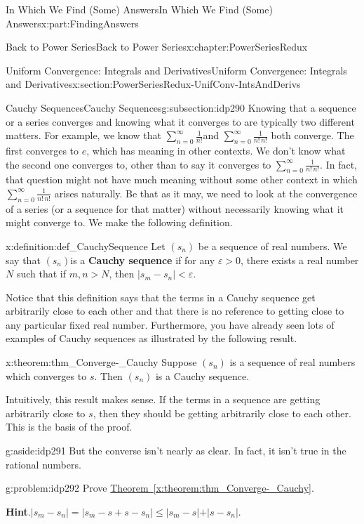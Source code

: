 \documentclass[oneside,10pt,]{book}
\newcommand{\blocktitlefont}{\relax}
\newcommand{\xreffont}{\relax}
\newcommand{\terminology}[1]{\textbf{#1}}
\numberwithin{equation}{section}
\newcommand{\eps}{\varepsilon}
\newcommand{\lt}{<}
\begin{document}
\begin{partptx}{In Which We Find (Some) Answers}{}{In Which We Find (Some) Answers}{}{}{x:part:FindingAnswers}
\begin{chapterptx}{Back to Power Series}{}{Back to Power Series}{}{}{x:chapter:PowerSeriesRedux}
\begin{sectionptx}{Uniform Convergence: Integrals and Derivatives}{}{Uniform Convergence: Integrals and Derivatives}{}{}{x:section:PowerSeriesRedux-UnifConv-IntsAndDerivs}
\begin{subsectionptx}{Cauchy Sequences}{}{Cauchy Sequences}{}{}{g:subsection:idp290}
Knowing that a sequence or a series converges and knowing what it converges to are typically two different matters. For example, we know that \(\sum_{n=0}^\infty\frac{1}{n!}\)and \(\sum_{n=0}^\infty\frac{1}{n!\,n!}\) both converge. The first converges to \(e\), which has meaning in other contexts. We don't know what the second one converges to, other than to say it converges to \(\sum_{n=0}^\infty\frac{1}{n!\,n!}\). In fact, that question might not have much meaning without some other context in which \(\sum_{n=0}^\infty\frac{1}{n!\,n!}\) arises naturally. Be that as it may, we need to look at the convergence of a series (or a sequence for that matter) without necessarily knowing what it might converge to. We make the following definition.%
\begin{definition}{}{x:definition:def_CauchySequence}%
 Let \(\left(s_n\right)\) be a sequence of real numbers. We say that \(\left(s_n\right)\)is a \terminology{Cauchy sequence} if for any \(\eps>0\), there exists a real number \(N\) such that if \(m,n>N\), then \(|s_m-s_n|\lt \eps\).%
\end{definition}
Notice that this definition says that the terms in a Cauchy sequence get arbitrarily close to each other and that there is no reference to getting close to any particular fixed real number. Furthermore, you have already seen lots of examples of Cauchy sequences as illustrated by the following result.%
\begin{theorem}{}{}{x:theorem:thm_Converge-_Cauchy}%
 Suppose \(\left(s_n\right)\) is a sequence of real numbers which converges to \(s\). Then \(\left(s_n\right)\) is a Cauchy sequence.%
\end{theorem}
Intuitively, this result makes sense. If the terms in a sequence are getting arbitrarily close to \(s\), then they should be getting arbitrarily close to each other. This is the basis of the proof.%
\begin{aside}{}{g:aside:idp291}%
But the converse isn't nearly as clear. In fact, it isn't true in the rational numbers.%
\end{aside}
\begin{problem}{}{g:problem:idp292}%
Prove \hyperref[x:theorem:thm_Converge-_Cauchy]{Theorem~{\xreffont\ref{x:theorem:thm_Converge-_Cauchy}}}.%
\par\smallskip%
\noindent\textbf{\blocktitlefont Hint}.\hypertarget{g:hint:idp293}{}\quad{}\(|s_m-s_n|=|s_m-s+s-s_n|\leq|s_m-s\mathopen|+|s-s_n|\).%

\end{problem}
\end{subsectionptx}
\end{sectionptx}
\end{chapterptx}
\end{partptx}
\end{document}
